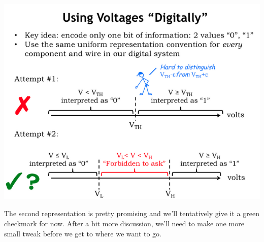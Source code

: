 \documentclass[a4paper,twoside]{article}
\numberwithin{equation}{section}
\begin{document}
\begin{center}
    \includegraphics[scale=0.4]{assets/attemps_voltage_repr.png}
\end{center}
The second representation is pretty promising and we'll tentatively give it a green
checkmark for now. After a bit more discussion, we'll need to make one more small tweak before
we get to where we want to go.
\end{document}
